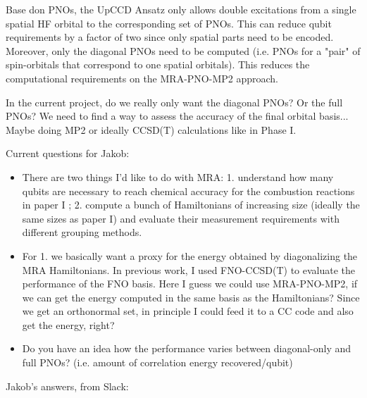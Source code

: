 \documentclass{article}
\begin{document}
Base don PNOs, the UpCCD Ansatz only allows double excitations from a single spatial HF orbital to the corresponding set of PNOs. This can reduce qubit requirements by a factor of two since only spatial parts need to be encoded. Moreover, only the diagonal PNOs need to be computed (i.e. PNOs for a "pair" of spin-orbitals that correspond to one spatial orbitals). This reduces the computational requirements on the MRA-PNO-MP2 approach.

In the current project, do we really only want the diagonal PNOs? Or the full PNOs? We need to find a way to assess the accuracy of the final orbital basis... Maybe doing MP2 or ideally CCSD(T) calculations like in Phase I.

Current questions for Jakob:
\begin{itemize}
\item There are two things I'd like to do with MRA: 1. understand how many qubits are necessary to reach chemical accuracy for the combustion reactions in paper I ; 2. compute a bunch of Hamiltonians of increasing size (ideally the same sizes as paper I) and evaluate their measurement requirements with different grouping methods.
\item For 1. we basically want a proxy for the energy obtained by diagonalizing the MRA Hamiltonians. In previous work, I used FNO-CCSD(T) to evaluate the performance of the FNO basis. Here I guess we could use MRA-PNO-MP2, if we can get the energy computed in the same basis as the Hamiltonians? Since we get an orthonormal set, in principle I could feed it to a CC code and also get the energy, right?
\item Do you have an idea how the performance varies between diagonal-only and full PNOs? (i.e. amount of correlation energy recovered/qubit)
\end{itemize}

Jakob's answers, from Slack:
\end{document}
